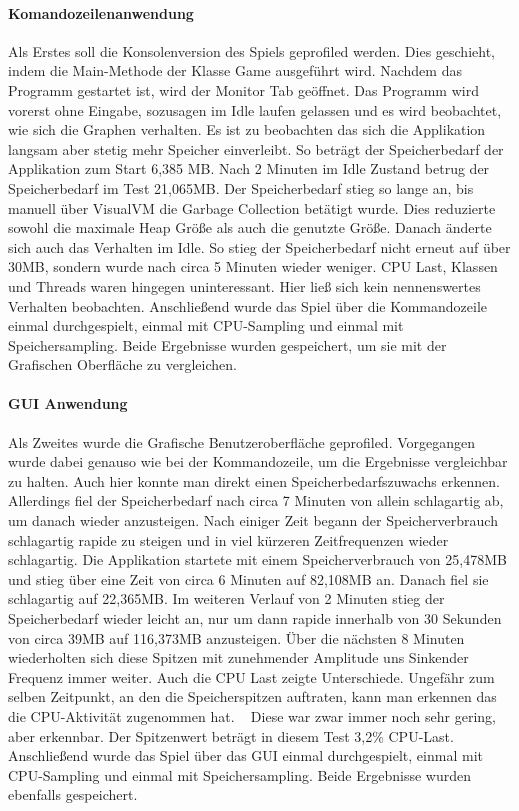 \documentclass[a4paper,12pt]{scrreprt}
\begin{document}
\paragraph{Komandozeilenanwendung}
Als Erstes soll die Konsolenversion des Spiels geprofiled werden. Dies geschieht, indem die Main-Methode der Klasse Game ausgeführt wird. Nachdem das Programm gestartet ist, wird der Monitor Tab geöffnet. Das Programm wird vorerst ohne Eingabe, sozusagen im Idle laufen gelassen und es wird beobachtet, wie sich die Graphen verhalten. Es ist zu beobachten das sich die Applikation langsam aber stetig mehr Speicher einverleibt. So beträgt der Speicherbedarf der Applikation zum Start 6,385 MB. Nach 2 Minuten im Idle Zustand betrug der Speicherbedarf im Test 21,065MB. Der Speicherbedarf stieg so lange an, bis manuell über VisualVM die Garbage Collection betätigt wurde. Dies reduzierte sowohl die maximale Heap Größe als auch die genutzte Größe. Danach änderte sich auch das Verhalten im Idle. So stieg der Speicherbedarf nicht erneut auf über 30MB, sondern wurde nach circa 5 Minuten wieder weniger. CPU Last, Klassen und Threads waren hingegen uninteressant. Hier ließ sich kein nennenswertes Verhalten beobachten.
Anschließend wurde das Spiel über die Kommandozeile einmal durchgespielt, einmal mit CPU-Sampling und einmal mit Speichersampling. Beide Ergebnisse wurden gespeichert, um sie mit der Grafischen Oberfläche zu vergleichen.

\paragraph{GUI Anwendung}
Als Zweites wurde die Grafische Benutzeroberfläche geprofiled. Vorgegangen wurde dabei genauso wie bei der Kommandozeile, um die Ergebnisse vergleichbar zu halten. Auch hier konnte man direkt einen Speicherbedarfszuwachs erkennen. Allerdings fiel der Speicherbedarf nach circa 7 Minuten von allein schlagartig ab, um danach wieder anzusteigen. Nach einiger Zeit begann der Speicherverbrauch schlagartig rapide zu steigen und in viel kürzeren Zeitfrequenzen wieder schlagartig. Die Applikation startete mit einem Speicherverbrauch von 25,478MB und stieg über eine Zeit von circa 6 Minuten auf 82,108MB an. Danach fiel sie schlagartig auf 22,365MB. Im weiteren Verlauf von 2 Minuten stieg der Speicherbedarf wieder leicht an, nur um dann rapide innerhalb von 30 Sekunden von circa 39MB auf 116,373MB anzusteigen. Über die nächsten 8 Minuten wiederholten sich diese Spitzen mit zunehmender Amplitude uns Sinkender Frequenz immer weiter. Auch die CPU Last zeigte Unterschiede. Ungefähr zum selben Zeitpunkt, an den die Speicherspitzen auftraten, kann man erkennen das die CPU-Aktivität zugenommen hat. ~\cite{fig:GUI_CPU_idle} Diese war zwar immer noch sehr gering, aber erkennbar. Der Spitzenwert beträgt in diesem Test 3,2\% CPU-Last. Anschließend wurde das Spiel über das GUI einmal durchgespielt, einmal mit CPU-Sampling und einmal mit Speichersampling. Beide Ergebnisse wurden ebenfalls gespeichert.
\end{document}
